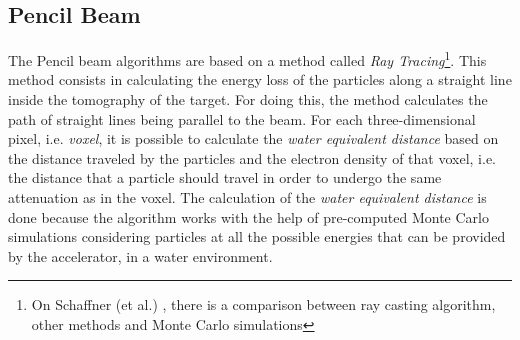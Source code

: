 \documentclass[12pt, a4paper, twoside]{book}
\begin{document}

\subsection{Pencil Beam} 
\label{sec:pen}
The Pencil beam algorithms are based on a method called \emph{Ray Tracing}\footnote{On Schaffner (et al.) \cite{schaf:pba}, there is a comparison between ray casting algorithm, other methods and Monte Carlo simulations}. This method consists in calculating the energy loss of the particles along a straight line inside the tomography of the target. For doing this, the method calculates the path of straight lines being parallel to the beam. For each three-dimensional pixel, i.e. \emph{voxel}, it is possible to calculate the \emph{water equivalent distance} based on the distance traveled by the particles and the electron density of that voxel, i.e. the distance that a particle should travel in order to undergo the same attenuation as in the voxel. The calculation of the \emph{water equivalent distance} is done because the algorithm works with the help of pre-computed Monte Carlo simulations considering particles at all the possible energies that can be provided by the accelerator, in a water environment. 
\end{document}
